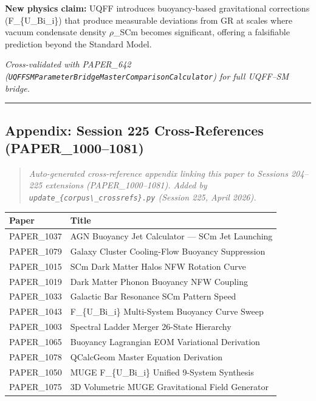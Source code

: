 \textbf{New physics claim:} UQFF introduces buoyancy-based gravitational
corrections (F\_\{U\_Bi\_i\}) that produce measurable deviations from GR
at scales where vacuum condensate density \(\rho\)\_SCm becomes
significant, offering a falsifiable prediction beyond the Standard
Model.

\emph{Cross-validated with PAPER\_642
(\texttt{UQFFSMParameterBridgeMasterComparisonCalculator}) for full
UQFF--SM bridge.}

\begin{center}\rule{0.5\linewidth}{0.5pt}\end{center}

\subsection{Appendix: Session 225 Cross-References
(PAPER\_1000--1081)}\label{appendix-session-225-cross-references-paper_10001081}

\begin{quote}
\emph{Auto-generated cross-reference appendix linking this paper to
Sessions 204--225 extensions (PAPER\_1000--1081). Added by
\texttt{update\_\{corpus\textbackslash{}\_crossrefs\}.py} (Session 225,
April 2026).}
\end{quote}

{\def\LTcaptype{none} %
\begin{longtable}[]{@{}ll@{}}
\toprule\noalign{}
Paper & Title \\
\midrule\noalign{}
\endhead
\bottomrule\noalign{}
\endlastfoot
PAPER\_1037 & AGN Buoyancy Jet Calculator --- SCm Jet Launching \\
PAPER\_1079 & Galaxy Cluster Cooling-Flow Buoyancy Suppression \\
PAPER\_1015 & SCm Dark Matter Halos NFW Rotation Curve \\
PAPER\_1019 & Dark Matter Phonon Buoyancy NFW Coupling \\
PAPER\_1033 & Galactic Bar Resonance SCm Pattern Speed \\
PAPER\_1043 & F\_\{U\_Bi\_i\} Multi-System Buoyancy Curve Sweep \\
PAPER\_1003 & Spectral Ladder Merger 26-State Hierarchy \\
PAPER\_1065 & Buoyancy Lagrangian EOM Variational Derivation \\
PAPER\_1078 & QCalcGeom Master Equation Derivation \\
PAPER\_1050 & MUGE F\_\{U\_Bi\_i\} Unified 9-System Synthesis \\
PAPER\_1075 & 3D Volumetric MUGE Gravitational Field Generator \\
\end{longtable}
}

